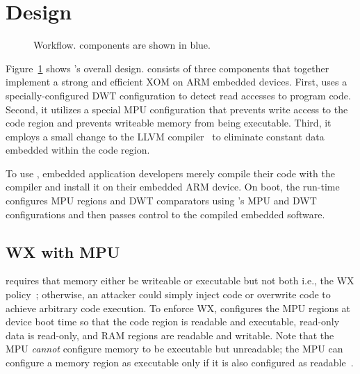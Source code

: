 \section{Design}
\label{sec:design}

\begin{figure}[tb]
  \centering
  \caption{{\System} Workflow.  {\System} components are shown in blue.}
  \label{fig:arch}
\end{figure}

Figure~\ref{fig:arch} shows {\System}'s overall design.
{\System} consists of three components that together implement a strong and
efficient XOM on ARM embedded devices.  First, {\System} uses a
specially-configured DWT configuration to detect read accesses to
program code.  Second, it utilizes a special MPU configuration that
prevents write access to the code region and prevents writeable memory
from being executable.  Third, it employs a small change to the LLVM
compiler~\cite{LLVM:CGO04} to eliminate constant data embedded within
the code region.

To use {\System}, embedded application developers merely compile
their code with the {\System} compiler and install it on their embedded
ARM device.  On boot, the {\System} run-time configures MPU regions and
DWT comparators using {\System}'s MPU and DWT configurations and
then passes control to the compiled embedded software.

\subsection{W{\XOR}X with MPU}
\label{sec:design:mpu}

{\System} requires that memory either be writeable or executable but
not both i.e., the W{\XOR}X policy~\cite{NoExec:PaX00}; otherwise,
an attacker could simply inject code or overwrite code to achieve
arbitrary code execution.
To enforce W{\XOR}X, {\System}
configures the MPU regions at device boot time so that the
code region is readable and executable, read-only data is read-only,
and RAM regions are readable and writable.  Note that the MPU
\emph{cannot} configure memory to be executable but unreadable;
the MPU can configure a memory region as executable only if it is also
configured as readable~\cite{ARMv7-M:Manual,ARMv8-M:Manual}.

